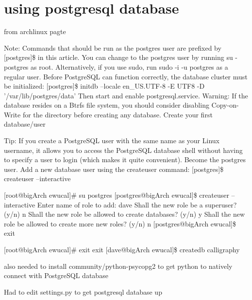 \chapter{using postgresql database}


from archlinux pagte

Note: Commands that should be run as the postgres user are prefixed by [postgres]\$ in this article. You can change to the postgres user by running su - postgres as root. Alternatively, if you use sudo, run sudo -i -u postgres as a regular user.
Before PostgreSQL can function correctly, the database cluster must be initialized:
[postgres]\$ initdb --locale en_US.UTF-8 -E UTF8 -D '/var/lib/postgres/data'
Then start and enable postgresql.service.
Warning: If the database resides on a Btrfs file system, you should consider disabling Copy-on-Write for the directory before creating any database.
Create your first database/user

Tip: If you create a PostgreSQL user with the same name as your Linux username, it allows you to access the PostgreSQL database shell without having to specify a user to login (which makes it quite convenient).
Become the postgres user. Add a new database user using the createuser command:
[postgres]\$ createuser --interactive



[root@bigArch ewucal]# su postgres
[postgres@bigArch ewucal]\$ createuser --interactive
Enter name of role to add: dave
Shall the new role be a superuser? (y/n) n
Shall the new role be allowed to create databases? (y/n) y
Shall the new role be allowed to create more new roles? (y/n) n
[postgres@bigArch ewucal]\$ exit

[root@bigArch ewucal]# exit
exit
[dave@bigArch ewucal]\$ createdb calligraphy

also needed to install community/python-psycopg2 to get python to natively connect with PostgreSQL database


Had to edit settings.py to get postgresql database up

